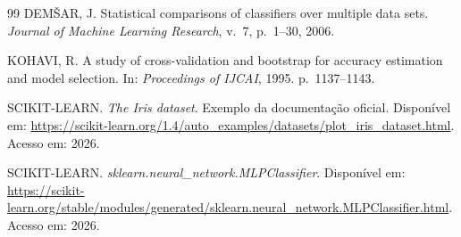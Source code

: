 \documentclass[12pt,a4paper]{article}
\theoremstyle{definition}
\theoremstyle{plain}
\theoremstyle{remark}
\begin{document}
\begin{thebibliography}{99}
DEMŠAR, J. Statistical comparisons of classifiers over multiple data sets.
\emph{Journal of Machine Learning Research}, v.~7, p.~1--30, 2006.

KOHAVI, R. A study of cross-validation and bootstrap for accuracy estimation and model selection.
In: \emph{Proceedings of IJCAI}, 1995. p.~1137--1143.

SCIKIT-LEARN. \emph{The Iris dataset}. Exemplo da documentação oficial.
Disponível em: \url{https://scikit-learn.org/1.4/auto_examples/datasets/plot_iris_dataset.html}.
Acesso em: 2026.

SCIKIT-LEARN. \emph{sklearn.neural\_network.MLPClassifier}.
Disponível em: \url{https://scikit-learn.org/stable/modules/generated/sklearn.neural_network.MLPClassifier.html}.
Acesso em: 2026.

\end{thebibliography}
\end{document}
